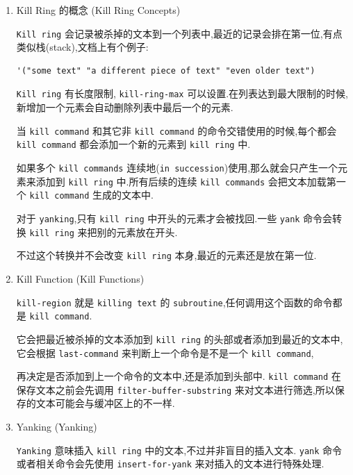 \documentclass[11pt]{article}
\begin{document}
\begin{enumerate}
\item Kill Ring 的概念 (Kill Ring Concepts)
\label{sec:orgbf1bc32}

\texttt{Kill ring} 会记录被杀掉的文本到一个列表中,最近的记录会排在第一位,有点类似栈(stack),文档上有个例子:

\begin{verbatim}
'("some text" "a different piece of text" "even older text")
\end{verbatim}

\texttt{Kill ring} 有长度限制, \texttt{kill-ring-max} 可以设置.在列表达到最大限制的时候,新增加一个元素会自动删除列表中最后一个的元素.

当 \texttt{kill command} 和其它非 \texttt{kill command} 的命令交错使用的时候,每个都会 \texttt{kill command} 都会添加一个新的元素到 \texttt{kill ring} 中.

如果多个 \texttt{kill commands} 连续地(\texttt{in succession})使用,那么就会只产生一个元素来添加到 \texttt{kill ring} 中.所有后续的连续 \texttt{kill commands} 会把文本加载第一个 \texttt{kill command} 生成的文本中.

对于 \texttt{yanking},只有 \texttt{kill ring} 中开头的元素才会被找回.一些 \texttt{yank} 命令会转换 \texttt{kill ring} 来把别的元素放在开头.

不过这个转换并不会改变 \texttt{kill ring} 本身,最近的元素还是放在第一位.


\item Kill Function (Kill Functions)
\label{sec:orgc5ed316}

\texttt{kill-region} 就是 \texttt{killing text} 的 \texttt{subroutine},任何调用这个函数的命令都是 \texttt{kill command}.

它会把最近被杀掉的文本添加到 \texttt{kill ring} 的头部或者添加到最近的文本中,它会根据 \texttt{last-command} 来判断上一个命令是不是一个 \texttt{kill command},

再决定是否添加到上一个命令的文本中,还是添加到头部中. \texttt{kill command} 在保存文本之前会先调用 \texttt{filter-buffer-substring} 来对文本进行筛选,所以保存的文本可能会与缓冲区上的不一样.



\item Yanking (Yanking)
\label{sec:orga486cab}

\texttt{Yanking} 意味插入 \texttt{kill ring} 中的文本,不过并非盲目的插入文本. \texttt{yank} 命令或者相关命令会先使用 \texttt{insert-for-yank} 来对插入的文本进行特殊处理.


\end{enumerate}
\end{document}
